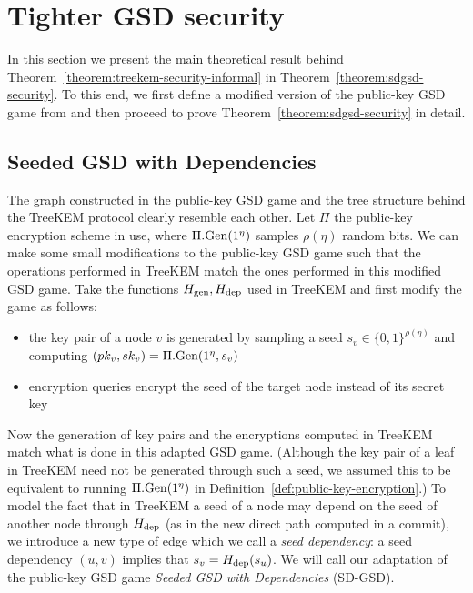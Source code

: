 \section{Tighter GSD security} \label{sec:tighter-gsd-security}

In this section we present the main theoretical result behind Theorem~\ref{theorem:treekem-security-informal} in Theorem~\ref{theorem:sdgsd-security}. To this end, we first define a modified version of the public-key GSD game from \cite{ttkem} and then proceed to prove Theorem~\ref{theorem:sdgsd-security} in detail.

\subsection{Seeded GSD with Dependencies}

The graph constructed in the public-key GSD game and the tree structure behind the TreeKEM protocol clearly resemble each other. Let $\Pi$ the public-key encryption scheme in use, where $\Pi.\mathrm{Gen}(1^\eta)$ samples $\rho(\eta)$ random bits. We can make some small modifications to the public-key GSD game such that the operations performed in TreeKEM match the ones performed in this modified GSD game. Take the functions $H_\mathrm{gen}, H_\mathrm{dep}$ used in TreeKEM and first modify the game as follows:
\begin{itemize}
	\item the key pair of a node $v$ is generated by sampling a seed $s_v \in \{0, 1\}^{\rho(\eta)}$ and computing $(pk_v, sk_v) = \Pi.\mathrm{Gen}(1^\eta, s_v)$
	\item encryption queries encrypt the seed of the target node instead of its secret key
\end{itemize}
Now the generation of key pairs and the encryptions computed in TreeKEM match what is done in this adapted GSD game. (Although the key pair of a leaf in TreeKEM need not be generated through such a seed, we assumed this to be equivalent to running $\Pi.\mathrm{Gen}(1^\eta)$ in Definition~\ref{def:public-key-encryption}.) To model the fact that in TreeKEM a seed of a node may depend on the seed of another node through $H_\mathrm{dep}$ (as in the new direct path computed in a commit), we introduce a new type of edge which we call a \emph{seed dependency}: a seed dependency $(u, v)$ implies that $s_v = H_\mathrm{dep}(s_u)$. We will call our adaptation of the public-key GSD game \emph{Seeded GSD with Dependencies} (SD-GSD).


